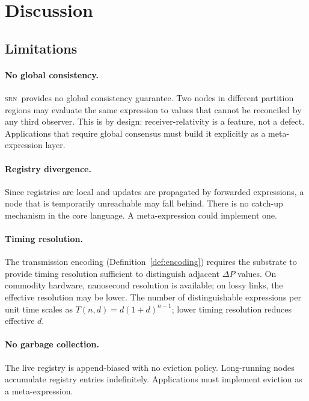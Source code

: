 \documentclass[twocolumn,11pt,a4paper]{article}
\theoremstyle{definition}
\theoremstyle{remark}
\newcommand{\srn}{\textsc{srn}}
\begin{document}
\section{Discussion}
\label{sec:discussion}

\subsection{Limitations}

\paragraph{No global consistency.}
\srn\ provides no global consistency guarantee.  Two nodes in different
partition regions may evaluate the same expression to values that
cannot be reconciled by any third observer.  This is by design:
receiver-relativity is a feature, not a defect.  Applications that
require global consensus must build it explicitly as a meta-expression
layer.

\paragraph{Registry divergence.}
Since registries are local and updates are propagated by forwarded
expressions, a node that is temporarily unreachable may fall behind.
There is no catch-up mechanism in the core language.  A meta-expression
could implement one.

\paragraph{Timing resolution.}
The transmission encoding (Definition~\ref{def:encoding}) requires the
substrate to provide timing resolution sufficient to distinguish adjacent
$\Delta P$ values.  On commodity hardware, nanosecond resolution is
available; on lossy links, the effective resolution may be lower.  The
number of distinguishable expressions per unit time scales as
$T(n, d) = d(1+d)^{n-1}$; lower timing resolution reduces effective
$d$.

\paragraph{No garbage collection.}
The live registry is append-biased with no eviction policy.  Long-running
nodes accumulate registry entries indefinitely.  Applications must
implement eviction as a meta-expression.
\end{document}
